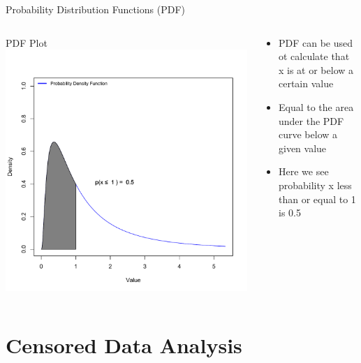 \documentclass{beamer}
\begin{document}
\begin{frame}{Probability  Distribution Functions (PDF)}
\begin{columns}    
	\begin{column}{4cm}        
		\begin{center}
		PDF Plot           
	 	\includegraphics[width=1.0\textwidth]{Figure3}        
		\end{center}   
	 \end{column}    
	\begin{column}{5cm}        
	  
	\begin{itemize}
	\item PDF can be used ot calculate that  x is at or below a certain value
	\item Equal to the area under the PDF curve below a given value
	\item Here we see probability x less than or equal to 1 is 0.5
	\end{itemize}
	\end{column}
	\end{columns}

\end{frame}


\section{Censored Data Analysis}
\end{document}
